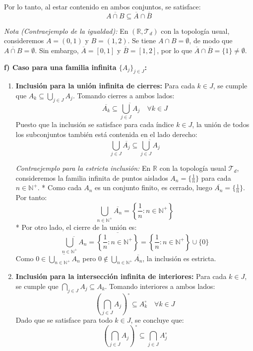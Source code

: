 \begin{sol}
    Por lo tanto, al estar contenido en ambos conjuntos, se satisface:
    \[
        \overline{A \cap B} \subseteq \overline{A} \cap \overline{B}
    \]

    \textit{Nota (Contraejemplo de la igualdad):} En $(\mathbb{R}, \mathcal{T}_d)$ con la topología usual, consideremos $A = (0, 1)$ y $B = (1, 2)$. Se tiene $A \cap B = \emptyset$, de modo que $\overline{A \cap B} = \emptyset$. Sin embargo, $\overline{A} = [0, 1]$ y $\overline{B} = [1, 2]$, por lo que $\overline{A} \cap \overline{B} = \{1\} \neq \emptyset$.

    \medskip

    \textbf{f) Caso para una familia infinita $\{A_j\}_{j \in J}$:}

    \begin{enumerate}[label=\arabic*)]
        \item \textbf{Inclusión para la unión infinita de cierres:}
        Para cada $k \in J$, se cumple que $A_k \subseteq \bigcup_{j \in J} A_j$. Tomando cierres a ambos lados:
        \[
            \overline{A_k} \subseteq \overline{\bigcup_{j \in J} A_j} \quad \forall k \in J
        \]
        Puesto que la inclusión se satisface para cada índice $k \in J$, la unión de todos los subconjuntos también está contenida en el lado derecho:
        \[
            \bigcup_{j \in J} \overline{A_j} \subseteq \overline{\bigcup_{j \in J} A_j}
        \]

        \textit{Contraejemplo para la estricta inclusión:}
        En $\mathbb{R}$ con la topología usual $\mathcal{T}_d$, consideremos la familia infinita de puntos aislados $A_n = \{\frac{1}{n}\}$ para cada $n \in \mathbb{N}^+$.
        * Como cada $A_n$ es un conjunto finito, es cerrado, luego $\overline{A_n} = \{\frac{1}{n}\}$. Por tanto:
          \[
              \bigcup_{n \in \mathbb{N}^+} \overline{A_n} = \left\{\frac{1}{n} : n \in \mathbb{N}^+\right\}
          \]
        * Por otro lado, el cierre de la unión es:
          \[
              \overline{\bigcup_{n \in \mathbb{N}^+} A_n} = \overline{\left\{\frac{1}{n} : n \in \mathbb{N}^+\right\}} = \left\{\frac{1}{n} : n \in \mathbb{N}^+\right\} \cup \{0\}
          \]
        Como $0 \in \overline{\bigcup_{n \in \mathbb{N}^+} A_n}$ pero $0 \notin \bigcup_{n \in \mathbb{N}^+} \overline{A_n}$, la inclusión es estricta.

        \medskip

        \item \textbf{Inclusión para la intersección infinita de interiores:}
        Para cada $k \in J$, se cumple que $\bigcap_{j \in J} A_j \subseteq A_k$. Tomando interiores a ambos lados:
        \[
            \left(\bigcap_{j \in J} A_j\right)^\circ \subseteq A_k^\circ \quad \forall k \in J
        \]
        Dado que se satisface para todo $k \in J$, se concluye que:
        \[
            \left(\bigcap_{j \in J} A_j\right)^\circ \subseteq \bigcap_{j \in J} A_j^\circ
        \]


\end{enumerate}
\end{sol}
